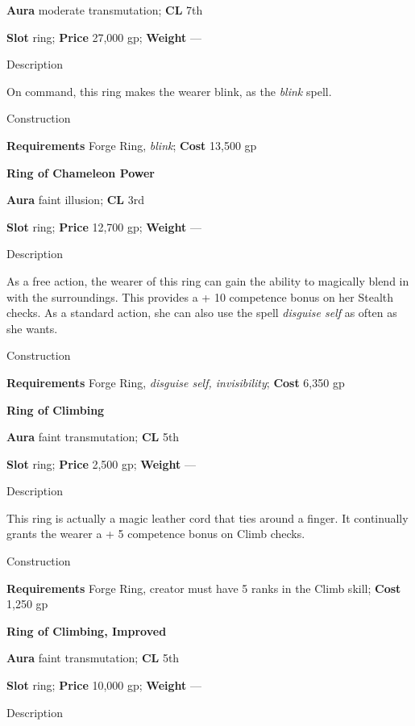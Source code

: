 \textbf{Aura} moderate transmutation;\textbf{ CL }7th
				
\textbf{Slot} ring; \textbf{Price} 27,000 gp; \textbf{Weight} ---
				
Description
				
On command, this ring makes the wearer blink, as the \textit{blink }spell. 
				
Construction
				
\textbf{Requirements} Forge Ring, \textit{blink}; \textbf{Cost }13,500 gp
				
\textbf{Ring of Chameleon Power}
				
\textbf{Aura} faint illusion;\textbf{ CL }3rd
				
\textbf{Slot} ring; \textbf{Price} 12,700 gp; \textbf{Weight} ---
				
Description
				
As a free action, the wearer of this ring can gain the ability 
to magically blend
 in with the surroundings. This provides a +
10 competence
 bonus on her Stealth checks. As a standard action, she can also use the spell \textit{disguise self }as often as she wants. 
				
Construction
				
\textbf{Requirements} Forge Ring, \textit{disguise self, invisibility}; \textbf{Cost }6,350 gp
				
\textbf{Ring of Climbing}
				
\textbf{Aura} faint transmutation;\textbf{ CL }5th
				
\textbf{Slot} ring; \textbf{Price} 2,500 gp; \textbf{Weight} ---
				
Description
				
This ring is actually a magic leather cord that ties around a finger. It continually grants the wearer a +
5 competence
 bonus on Climb checks. 
				
Construction
				
\textbf{Requirements} Forge Ring, creator must have 5 ranks in the Climb skill; \textbf{Cost }1,250 gp
				
\textbf{Ring of Climbing, Improved}
				
\textbf{Aura} faint transmutation;\textbf{ CL }5th
				
\textbf{Slot} ring; \textbf{Price} 10,000 gp; \textbf{Weight} ---
				
Description
				
